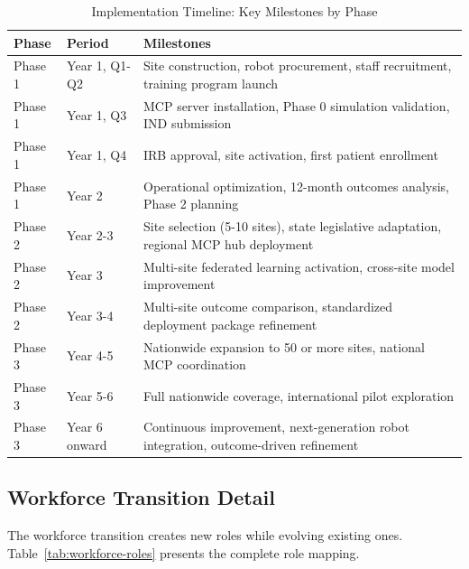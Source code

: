 \begin{table}[H]
\centering
\caption{Implementation Timeline: Key Milestones by Phase}
\label{tab:impl-timeline}
\small
\begin{tabularx}{\textwidth}{l l X}
\toprule
\textbf{Phase} & \textbf{Period} & \textbf{Milestones} \\
\midrule
Phase 1 & Year 1, Q1-Q2 & Site construction, robot procurement, staff recruitment, training program launch \\
Phase 1 & Year 1, Q3 & MCP server installation, Phase 0 simulation validation, IND submission \\
Phase 1 & Year 1, Q4 & IRB approval, site activation, first patient enrollment \\
Phase 1 & Year 2 & Operational optimization, 12-month outcomes analysis, Phase 2 planning \\
\midrule
Phase 2 & Year 2-3 & Site selection (5-10 sites), state legislative adaptation, regional MCP hub deployment \\
Phase 2 & Year 3 & Multi-site federated learning activation, cross-site model improvement \\
Phase 2 & Year 3-4 & Multi-site outcome comparison, standardized deployment package refinement \\
\midrule
Phase 3 & Year 4-5 & Nationwide expansion to 50 or more sites, national MCP coordination \\
Phase 3 & Year 5-6 & Full nationwide coverage, international pilot exploration \\
Phase 3 & Year 6 onward & Continuous improvement, next-generation robot integration, outcome-driven refinement \\
\bottomrule
\end{tabularx}
\end{table}

\subsection{Workforce Transition Detail}
\label{subsec:impl-workforce-detail}

The workforce transition creates new roles while evolving existing ones.
Table~\ref{tab:workforce-roles} presents the complete role mapping.

